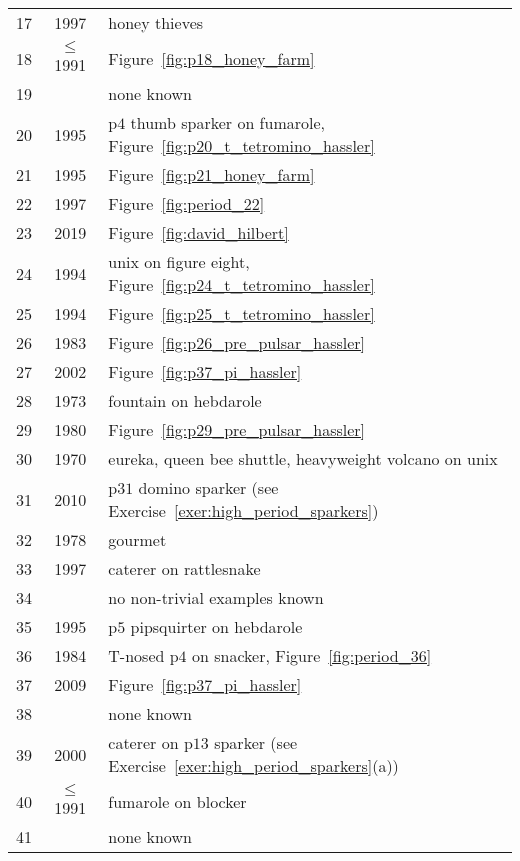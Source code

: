 \begin{table}[!ptb]
\begin{center}
\begin{tabular}{c c l}
			\rowcolor{gray!20} 17 & 1997 & honey thieves \\
			18 & $\leq$1991 & Figure~\ref{fig:p18_honey_farm} \\
			\rowcolor{redback!50} 19 & & none known \\
			20 & 1995 & p$4$ thumb sparker on fumarole, Figure~\ref{fig:p20_t_tetromino_hassler} \\
			\rowcolor{gray!20} 21 & 1995 & Figure~\ref{fig:p21_honey_farm} \\
			22 & 1997 & Figure~\ref{fig:period_22} \\
			\rowcolor{gray!20} 23 & 2019 & Figure~\ref{fig:david_hilbert} \\
			24 & 1994 & unix on figure eight, Figure~\ref{fig:p24_t_tetromino_hassler} \\
			\rowcolor{gray!20} 25 & 1994 & Figure~\ref{fig:p25_t_tetromino_hassler} \\
			26 & 1983 & Figure~\ref{fig:p26_pre_pulsar_hassler} \\
			\rowcolor{gray!20} 27 & 2002 & Figure~\ref{fig:p37_pi_hassler} \\
			28 & 1973 & fountain on hebdarole \\
			\rowcolor{gray!20} 29 & 1980 & Figure~\ref{fig:p29_pre_pulsar_hassler} \\
			30 & 1970 & eureka, queen bee shuttle, heavyweight volcano on unix \\
			\rowcolor{gray!20} 31 & 2010 & p$31$ domino sparker (see Exercise~\ref{exer:high_period_sparkers})\\
			32 & 1978 & gourmet \\
			\rowcolor{gray!20} 33 & 1997 & caterer on rattlesnake \\
			\rowcolor{redback!50} 34 & & no non-trivial examples known \\
			\rowcolor{gray!20} 35 & 1995 & p$5$ pipsquirter on hebdarole \\
			36 & 1984 & T-nosed p$4$ on snacker, Figure~\ref{fig:period_36} \\
			\rowcolor{gray!20} 37 & 2009 & Figure~\ref{fig:p37_pi_hassler} \\
			\rowcolor{redback!50} 38 & & none known \\
			\rowcolor{gray!20} 39 & 2000 & caterer on p$13$ sparker (see Exercise~\ref{exer:high_period_sparkers}(a)) \\
			40 & $\leq$1991 & fumarole on blocker \\
			\rowcolor{redback!50} 41 & & none known \\

\end{tabular}
\end{center}
\end{table}
